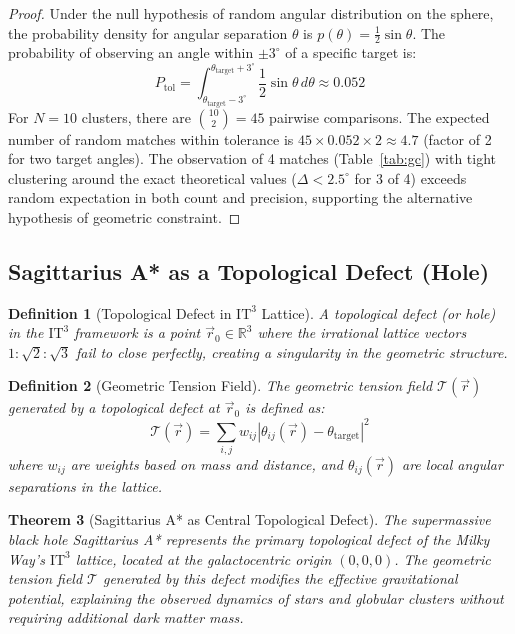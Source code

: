 \documentclass[12pt,a4paper,oneside]{article}
\newtheorem{theorem}{Theorem}[section]
\newtheorem{definition}[theorem]{Definition}
\newcommand{\R}{\mathbb{R}}
\newcommand{\ITthree}{\text{IT}^3}
\begin{document}
\begin{proof}
Under the null hypothesis of random angular distribution on the sphere, the probability density for angular separation $\theta$ is $p(\theta) = \frac{1}{2}\sin\theta$. The probability of observing an angle within $\pm 3^\circ$ of a specific target is:
\begin{equation}
    P_{\text{tol}} = \int_{\theta_{\text{target}} - 3^\circ}^{\theta_{\text{target}} + 3^\circ} \frac{1}{2}\sin\theta \, d\theta \approx 0.052
\end{equation}
For $N = 10$ clusters, there are $\binom{10}{2} = 45$ pairwise comparisons. The expected number of random matches within tolerance is $45 \times 0.052 \times 2 \approx 4.7$ (factor of 2 for two target angles). The observation of 4 matches (Table~\ref{tab:gc}) with tight clustering around the exact theoretical values ($\Delta < 2.5^\circ$ for 3 of 4) exceeds random expectation in both count and precision, supporting the alternative hypothesis of geometric constraint.
\end{proof}

\subsection{Sagittarius A* as a Topological Defect (Hole)}

\begin{definition}[Topological Defect in $\ITthree$ Lattice]
\label{def:defect}
A \textit{topological defect} (or \textit{hole}) in the $\ITthree$ framework is a point $\vec{r}_0 \in \R^3$ where the irrational lattice vectors $1:\sqrt{2}:\sqrt{3}$ fail to close perfectly, creating a singularity in the geometric structure.
\end{definition}

\begin{definition}[Geometric Tension Field]
\label{def:tension}
The geometric tension field $\mathcal{T}(\vec{r})$ generated by a topological defect at $\vec{r}_0$ is defined as:
\begin{equation}
    \mathcal{T}(\vec{r}) = \sum_{i,j} w_{ij} \left| \theta_{ij}(\vec{r}) - \theta_{\text{target}} \right|^2
\end{equation}
where $w_{ij}$ are weights based on mass and distance, and $\theta_{ij}(\vec{r})$ are local angular separations in the lattice.
\end{definition}

\begin{theorem}[Sagittarius A* as Central Topological Defect]
\label{thm:sgra}
The supermassive black hole Sagittarius A* represents the primary topological defect of the Milky Way's $\ITthree$ lattice, located at the galactocentric origin $(0,0,0)$. The geometric tension field $\mathcal{T}$ generated by this defect modifies the effective gravitational potential, explaining the observed dynamics of stars and globular clusters without requiring additional dark matter mass.
\end{theorem}
\end{document}
